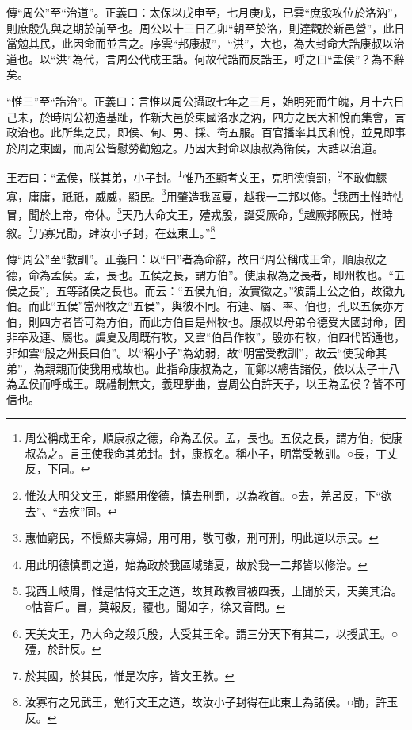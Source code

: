 {\noindent\zhuan{}\fzbyks 傳“周公”至“治道”。正義曰：太保以戊申至，七月庚戌，已雲“庶殷攻位於洛汭”，則庶殷先與之期於前至也。周公以十三日乙卯“朝至於洛，則達觀於新邑營”，此日當勉其民，此因命而並言之。序雲“邦康叔”，“洪”，大也，為大封命大誥康叔以治道也。以“洪”為代，言周公代成王誥。何故代誥而反誥王，呼之曰“孟侯”？為不辭矣。 \par}

{\noindent\shu{}\fzkt “惟三”至“誥治”。正義曰：言惟以周公攝政七年之三月，始明死而生魄，月十六日己未，於時周公初造基趾，作新大邑於東國洛水之汭，四方之民大和悅而集會，言政治也。此所集之民，即侯、甸、男、採、衛五服。百官播率其民和悅，並見即事於周之東國，而周公皆慰勞勸勉之。乃因大封命以康叔為衛侯，大誥以治道。 \par}

王若曰：“孟侯，朕其弟，小子封。\footnote{周公稱成王命，順康叔之德，命為孟侯。孟，長也。五侯之長，謂方伯，使康叔為之。言王使我命其弟封。封，康叔名。稱小子，明當受教訓。○長，丁丈反，下同。}惟乃丕顯考文王，克明德慎罰，\footnote{惟汝大明父文王，能顯用俊德，慎去刑罰，以為教首。○去，羌呂反，下“欲去”、“去疾”同。}不敢侮鰥寡，庸庸，祇祇，威威，顯民。\footnote{惠恤窮民，不慢鰥夫寡婦，用可用，敬可敬，刑可刑，明此道以示民。}用肇造我區夏，越我一二邦以修。\footnote{用此明德慎罰之道，始為政於我區域諸夏，故於我一二邦皆以修治。}我西土惟時怙冒，聞於上帝，帝休。\footnote{我西土岐周，惟是怙恃文王之道，故其政教冒被四表，上聞於天，天美其治。○怙音戶。冒，莫報反，覆也。聞如字，徐又音問。}天乃大命文王，殪戎殷，誕受厥命，\footnote{天美文王，乃大命之殺兵殷，大受其王命。謂三分天下有其二，以授武王。○殪，於計反。}越厥邦厥民，惟時敘。\footnote{於其國，於其民，惟是次序，皆文王教。}乃寡兄勖，肆汝小子封，在茲東土。”\footnote{汝寡有之兄武王，勉行文王之道，故汝小子封得在此東土為諸侯。○勖，許玉反。}


{\noindent\zhuan{}\fzbyks 傳“周公”至“教訓”。正義曰：以“曰”者為命辭，故曰“周公稱成王命，順康叔之德，命為孟侯。孟，長也。五侯之長，謂方伯”。使康叔為之長者，即州牧也。“五侯之長”，五等諸侯之長也。而云：“五侯九伯，汝實徵之。”彼謂上公之伯，故徵九伯。而此“五侯”當州牧之“五侯”，與彼不同。有連、屬、率、伯也，孔以五侯亦方伯，則四方者皆可為方伯，而此方伯自是州牧也。康叔以母弟令德受大國封命，固非卒及連、屬也。虞夏及周既有牧，又雲“伯昌作牧”，殷亦有牧，伯四代皆通也，非如雲“殷之州長曰伯”。以“稱小子”為幼弱，故“明當受教訓”，故云“使我命其弟”，為親親而使我用戒故也。此指命康叔為之，而鄭以總告諸侯，依以太子十八為孟侯而呼成王。既禮制無文，義理駢曲，豈周公自許天子，以王為孟侯？皆不可信也。 \par}


